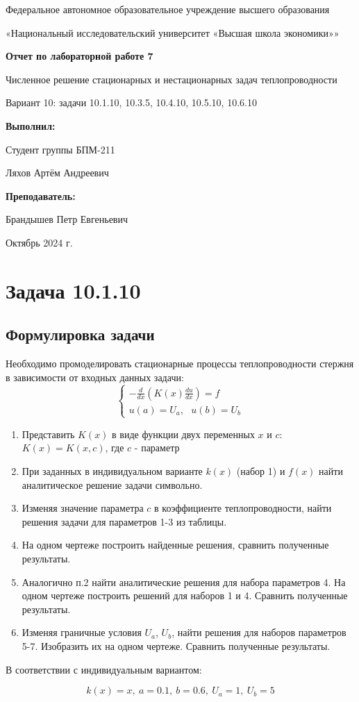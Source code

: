 \documentclass[12pt]{article}%
\date{}{Октябрь 2024 г.}
\newcommand*{\Title}{\begingroup
\centering 

\large {Федеральное автономное образовательное учреждение высшего образования}
\vspace*{\baselineskip}

\large {«Национальный исследовательский университет «Высшая школа экономики»»}
\vspace*{\baselineskip}

\vspace*{\baselineskip}
\large{\textbf{Отчет по лабораторной работе 7}}

\vspace{0.1cm}
\large{Численное решение стационарных и нестационарных задач теплопроводности}

\vspace{0.2cm}
\large{Вариант 10: задачи 10.1.10, 10.3.5, 10.4.10, 10.5.10, 10.6.10}

\vspace{1.5cm} 

\begin{flushright}
  \textbf{\normalsize Выполнил:}
  
  \vspace{0.3cm} 
  {\normalsize Студент группы БПМ-211}
  
  {\normalsize Ляхов Артём Андреевич}

\end{flushright}


\vspace{0.2cm}  
\begin{flushright}
  \textbf{\normalsize Преподаватель:} 

  \vspace{0.2cm}

 {\normalsize Брандышев Петр Евгеньевич}
 
\end{flushright}

\vfill
\date{}{Октябрь 2024 г.}


\endgroup\clearpage}
\begin{document}
\Title
\tableofcontents

\newpage
\section{Задача 10.1.10}
\subsection{Формулировка задачи}
Необходимо промоделировать стационарные процессы теплопроводности стержня в зависимости от входных данных задачи:
\begin{equation*}
\begin{cases}
    -\frac{d}{dx}\left(
        K(x) \frac{du}{dx}
    \right) = f \\
    u(a) = U_a,\ \ \ u(b) = U_b
\end{cases}
\end{equation*}

\begin{enumerate}
    \item Представить $K(x)$ в виде функции двух переменных $x$ и $c$: $K(x) = K(x, c)$, где $c$ - параметр
    \item При заданных в индивидуальном варианте $k(x)$ (набор 1) и $f(x)$ найти аналитическое решение задачи символьно.
    \item Изменяя значение параметра $c$ в коэффициенте теплопроводности, найти решения задачи для параметров 1-3 из таблицы.
    \item На одном чертеже построить найденные решения, сравнить полученные результаты.
    \item Аналогично п.2 найти аналитические решения для набора параметров 4. На одном чертеже построить решений для наборов 1 и 4. Сравнить полученные результаты.
    \item Изменяя граничные условия $U_a$, $U_b$, найти решения для наборов параметров 5-7. Изобразить их на одном чертеже. Сравнить полученные результаты.
\end{enumerate}

В соответствии с индивидуальным вариантом:

\begin{equation*}
k(x) = x,\ a = 0.1,\ b = 0.6,\ U_a = 1,\ U_b = 5
\end{equation*}

\newpage
\end{document}
